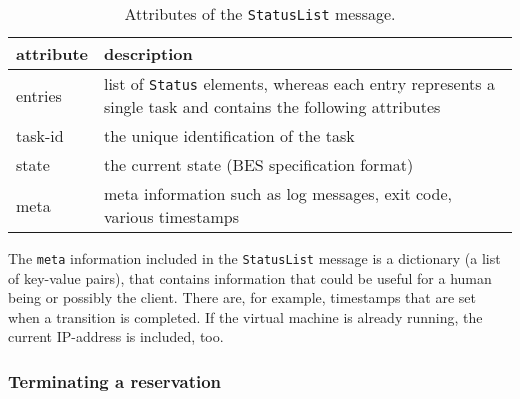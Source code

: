 \medskip
\begin{table}[ht]
  \centering
  \begin{tabular}{@{}lp{}@{}}\toprule
    attribute        & \multicolumn{1}{l}{description} \\ \midrule %
    entries          & list of \texttt{Status} elements, whereas each
                       entry represents a single task and contains
                       the following attributes \\
    task-id          & the unique identification of the task \\
    state            & the current state (BES specification format) \\
    meta             & meta information such as log messages, exit code, various timestamps \\
    \bottomrule
  \end{tabular}
  \caption{Attributes of the \texttt{StatusList} message.}
  \label{tab:msg:status-list}
\end{table}


The \texttt{meta} information  included in the \texttt{StatusList} message
is a dictionary (\ie a list of key-value pairs), that contains information
that could be useful for a human being or possibly the client.  There are,
for example,  timestamps that are set  when a transition  is completed. If
the  virtual  machine  is  already  running,  the  current  IP-address  is
included, too.


\subsubsection{Terminating a reservation}

